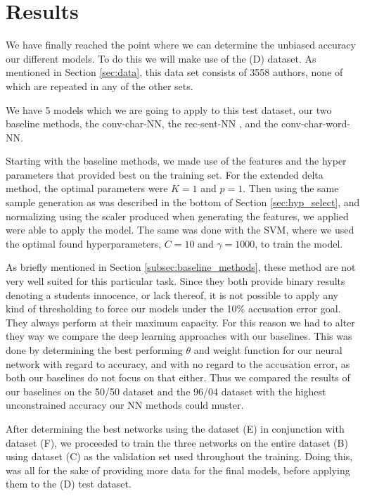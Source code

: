 \section{Results} \label{sec:results}

We have finally reached the point where we can determine the unbiased accuracy
our different models. To do this we will make use of the (D) dataset. As
mentioned in Section \ref{sec:data}, this data set consists of 3558 authors,
none of which are repeated in any of the other sets.

We have 5 models which we are going to apply to this test dataset, our
two baseline methods, the \gls{conv-char-NN}, the \gls{rec-sent-NN} , and the
\gls{conv-char-word-NN}.

Starting with the baseline methods, we made use of the features and the
hyper parameters that provided best on the training set. For the extended
delta method, the optimal parameters were $K=1$ and $p = 1$. Then using
the same sample generation as was described in the bottom of Section
\ref{sec:hyp_select}, and normalizing using the scaler produced when
generating the features, we applied were able to apply the model. The same
was done with the \gls{SVM}, where we used the optimal found hyperparameters, $C=10$
and $\gamma = 1000$, to train the model. 

As briefly mentioned in Section \ref{subsec:baseline_methods}, these method are
not very well suited for this particular task. Since they both provide binary
results denoting a students innocence, or lack thereof, it is not possible to
apply any kind of thresholding to force our models under the 10\% accusation
error goal. They always perform at their maximum capacity. For this reason
we had to alter they way we compare the deep learning approaches with our
baselines. This was done by determining the best performing $\theta$ and weight
function for our neural network with regard to accuracy, and with no regard to
the accusation error, as both our baselines do not focus on that either. Thus we
compared the results of our baselines on the 50/50 dataset and the 96/04 dataset
with the highest unconstrained accuracy our \gls{NN} methods could muster.

After determining the best networks using the dataset (E) in conjunction with
dataset (F), we proceeded to train the three networks on the entire dataset (B)
using dataset (C) as the validation set used throughout the training. Doing
this, was all for the sake of providing more data for the final models, before
applying them to the (D) test dataset.

